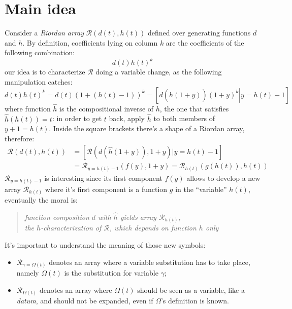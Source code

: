 
\section{Main idea}

Consider a \emph{Riordan array} $\mathcal{R}\left(d(t),h(t)\right)$ 
defined over generating functions $d$ and $h$. 
By definition, coefficients lying on 
column $k$ are the coefficients of the following combination:
\begin{displaymath}
    d(t)h(t)^k
\end{displaymath}
our idea is to characterize $\mathcal{R}$ doing a variable change, as the
following manipulation catches:
\begin{displaymath}
    d(t)h(t)^k = d(t)(1 + (h(t)-1))^k = \left[ \left. d(\hat{h}(1+y))(1+y)^k \right|y = h(t)-1  \right]
\end{displaymath}
where function $\hat{h}$ is the compositional inverse of $h$, the one that
satisfies $\hat{h}(h(t)) = t$: in order to get $t$ back, apply $\hat{h}$ to
both members of $y+1 = h(t)$.
Inside the square brackets there's a shape of a Riordan array, therefore:
\begin{displaymath}
    \begin{split}
        \mathcal{R}\left(d(t),h(t)\right) &= \left[ \mathcal{R}\left(d(\hat{h}(1+y)), 1+y\right) \left| y = h(t)-1 \right. \right]\\
        &= \mathcal{R}_{y=h(t)-1}\left( f(y), 1+y \right) =  \mathcal{R}_{h(t)}\left( g(h(t)), h(t) \right) 
    \end{split}
\end{displaymath}
$\mathcal{R}_{y=h(t)-1}$ is interesting since its first component $f(y)$ allows to 
develop a new array $\mathcal{R}_{h(t)}$ where it's first component
is a function $g$ in the ``variable'' $h(t)$, eventually the moral is:
\begin{quote}
    \emph{function composition $d$ with $\hat{h}$ yields array $\mathcal{R}_{h(t)}$,\\
        the $h$-characterization of $\mathcal{R}$, which depends on function $h$ only }
\end{quote}
It's important to understand the meaning of those new symbols:
\begin{itemize}
    \item $\mathcal{R}_{\gamma=\Omega(t)}$ denotes an array where a variable
        substitution has to take place, namely $\Omega(t)$ is the substitution 
        for variable $\gamma$;
    \item $\mathcal{R}_{\Omega(t)}$ denotes an array where $\Omega(t)$ should 
        be seen as a variable, like a \emph{datum}, and should not be expanded,
        even if $\Omega$'s definition is known. 
\end{itemize}

